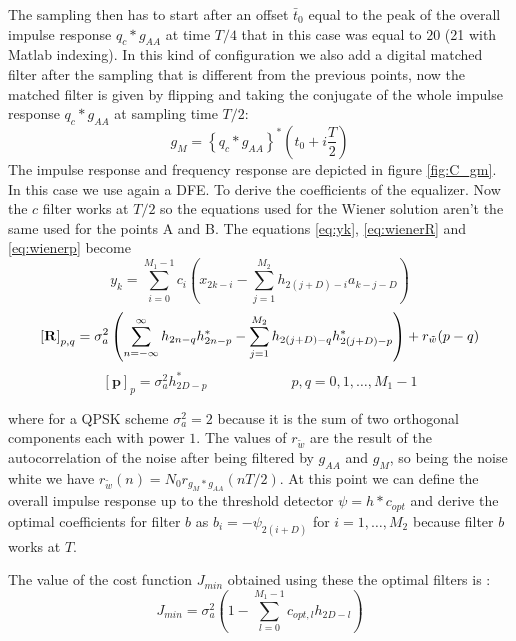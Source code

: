 \documentclass[a4paper,11.5pt]{article}
\begin{document}
The sampling then has to start after an offset $\bar{t}_0$ equal to the peak of the overall impulse response $q_c*g_{AA}$ at time $T/4$ that in this case was equal to $20$ (21 with Matlab indexing).  
In this kind of configuration we also add a digital matched filter after the sampling that is different from the previous points, now the matched filter is given by flipping and taking the conjugate of the whole impulse response $q_c*g_{AA}$ at sampling time $T/2$:
\begin{equation}
g_M = \left\{ q_c * g_{AA} \right\}^* \left(t_0 + i \frac{T}{2}\right) 
\end{equation}
The impulse response and frequency response are depicted in figure \ref{fig:C_gm}. 
In this case we use again a DFE. To derive the coefficients of the equalizer. Now the $c$ filter works at $T/2$ so the equations used for the Wiener solution aren't the same used for the points A and B. The equations \ref{eq:yk}, \ref{eq:wienerR} and \ref{eq:wienerp} become
\begin{equation} \label{eq:C_yk}
y_k = \sum_{i=0}^{M_1-1}c_i \left(x_{2k-i}-\sum_{j=1}^{M_2}h_{2(j+D)-i}a_{k-j-D} \right)
\end{equation}
\begin{equation} \label{eq:C_wienerR}
\mathbf{[R]}_{p,q}  = \sigma_a^2 \left( \sum_{n=-\infty}^{\infty}h_{2n-q}h^*_{2n-p}-\sum_{j=1}^{M_2}h_{2(j+D)-q}h^*_{2(j+D)-p} \right) + r_{\tilde{w}}(p-q) \\
\end{equation}
\begin{equation} \label{eq:C_wienerp}
\mathbf{[p]}_p = \sigma_a^2 h^*_{2D-p} \quad\quad\quad\quad\quad\quad p,q = 0,1,\dots,M_1-1
\end{equation}

where for a QPSK scheme $\sigma_a^2=2$ because it is the sum of two orthogonal components each with power $1$. The values of $r_{\tilde{w}}$ are the result of the autocorrelation of the noise after being filtered by $g_{AA}$ and $g_M$, so being the noise white we have $r_{\tilde{w}}(n)=N_0r_{g_M * g_{AA}}(nT/2)$. At this point we can define the overall impulse response up to the threshold detector $\psi = h*c_{opt}$ and derive the optimal coefficients for filter $b$ as $b_i=-\psi_{2(i+D)}$ for $i=1,\dots,M_2$ because filter $b$ works at $T$. 

The value of the cost function $J_{min}$ obtained using these the optimal filters is :
\begin{equation} \label{eq:C_jmin}
J_{min} = \sigma^2_a \left( 1-\sum_{l=0}^{M_1-1} c_{opt,l}h_{2D-l}\right)
\end{equation}
\end{document}
